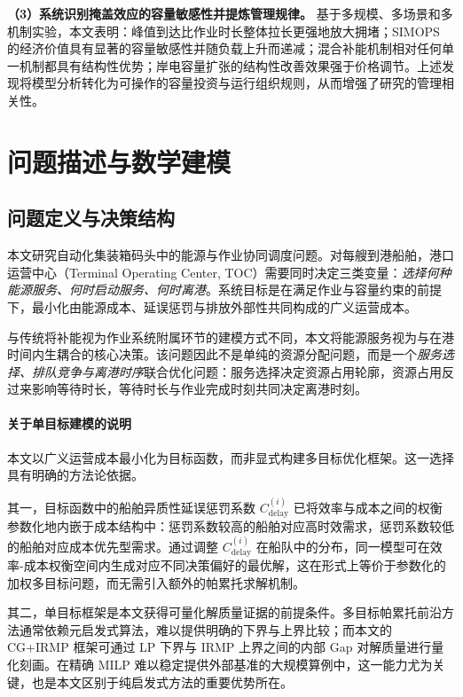 \documentclass[UTF8, a4paper, 12pt]{ctexart}
\theoremstyle{plain}
\theoremstyle{definition}
\theoremstyle{remark}
\begin{document}
\textbf{（3）系统识别掩盖效应的容量敏感性并提炼管理规律。}
基于多规模、多场景和多机制实验，本文表明：峰值到达比作业时长整体拉长更强地放大拥堵；SIMOPS 的经济价值具有显著的容量敏感性并随负载上升而递减；混合补能机制相对任何单一机制都具有结构性优势；岸电容量扩张的结构性改善效果强于价格调节。上述发现将模型分析转化为可操作的容量投资与运行组织规则，从而增强了研究的管理相关性。
\section{问题描述与数学建模}
\label{sec:model}

\subsection{问题定义与决策结构}
\label{sec:problem_definition_cn}

本文研究自动化集装箱码头中的能源与作业协同调度问题。对每艘到港船舶，港口运营中心（Terminal Operating Center, TOC）需要同时决定三类变量：\emph{选择何种能源服务、何时启动服务、何时离港}。系统目标是在满足作业与容量约束的前提下，最小化由能源成本、延误惩罚与排放外部性共同构成的广义运营成本。

与传统将补能视为作业系统附属环节的建模方式不同，本文将能源服务视为与在港时间内生耦合的核心决策。该问题因此不是单纯的资源分配问题，而是一个\emph{服务选择、排队竞争与离港时序}联合优化问题：服务选择决定资源占用轮廓，资源占用反过来影响等待时长，等待时长与作业完成时刻共同决定离港时刻。

\paragraph{关于单目标建模的说明}
本文以广义运营成本最小化为目标函数，而非显式构建多目标优化框架。这一选择具有明确的方法论依据。

其一，目标函数中的船舶异质性延误惩罚系数 $C^{(i)}_{\text{delay}}$ 已将效率与成本之间的权衡参数化地内嵌于成本结构中：惩罚系数较高的船舶对应高时效需求，惩罚系数较低的船舶对应成本优先型需求。通过调整 $C^{(i)}_{\text{delay}}$ 在船队中的分布，同一模型可在效率-成本权衡空间内生成对应不同决策偏好的最优解，这在形式上等价于参数化的加权多目标问题，而无需引入额外的帕累托求解机制。

其二，单目标框架是本文获得可量化解质量证据的前提条件。多目标帕累托前沿方法通常依赖元启发式算法，难以提供明确的下界与上界比较；而本文的 CG+IRMP 框架可通过 LP 下界与 IRMP 上界之间的内部 Gap 对解质量进行量化刻画。在精确 MILP 难以稳定提供外部基准的大规模算例中，这一能力尤为关键，也是本文区别于纯启发式方法的重要优势所在。
\end{document}
